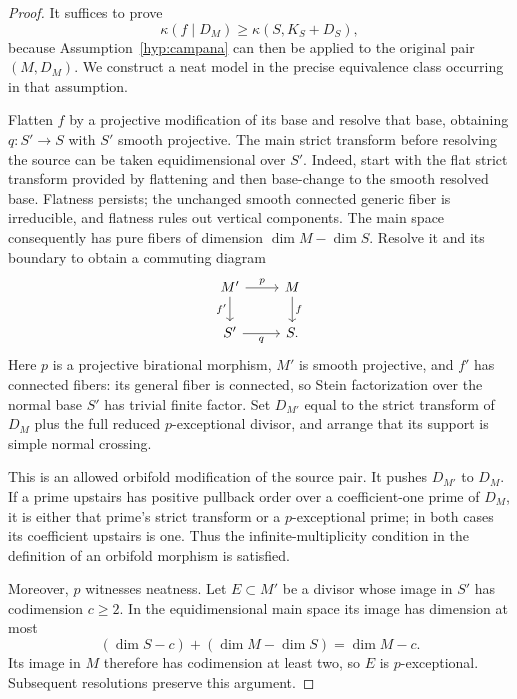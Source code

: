 \begin{proof}
It suffices to prove
\begin{equation}\label{red:invariant-base-bound}
 \kappa(f\mid D_M)\geq\kappa(S,K_S+D_S),
\end{equation}
because Assumption~\ref{hyp:campana} can then be applied to the original
pair \((M,D_M)\). We construct a neat model in the precise equivalence
class occurring in that assumption.

Flatten \(f\) by a projective modification of its base and resolve that
base, obtaining \(q:S'\to S\) with \(S'\) smooth projective. The main
strict transform before resolving the source can be taken
equidimensional over \(S'\). Indeed, start with the flat strict transform
provided by flattening and then base-change to the smooth resolved
base. Flatness persists; the unchanged smooth connected generic fiber
is irreducible, and flatness rules out vertical components. The main
space consequently has pure fibers of dimension \(\dim M-\dim S\).
Resolve it and its boundary to obtain a commuting diagram
\[
\begin{tikzcd}
 M' \arrow[r,"p"] \arrow[d,"f'"'] & M \arrow[d,"f"]\\
 S' \arrow[r,"q"'] & S .
\end{tikzcd}
\]
Here \(p\) is a projective birational morphism, \(M'\) is smooth
projective, and \(f'\) has connected fibers: its general fiber is
connected, so Stein factorization over the normal base \(S'\) has trivial
finite factor. Set \(D_{M'}\) equal to the strict transform of \(D_M\)
plus the full reduced \(p\)-exceptional divisor, and arrange that its
support is simple normal crossing.

This is an allowed orbifold modification of the source pair. It pushes
\(D_{M'}\) to \(D_M\). If a prime upstairs has positive pullback order
over a coefficient-one prime of \(D_M\), it is either that prime's
strict transform or a \(p\)-exceptional prime; in both cases its
coefficient upstairs is one. Thus the infinite-multiplicity condition
in the definition of an orbifold morphism is satisfied.

Moreover, \(p\) witnesses neatness. Let \(E\subset M'\) be a divisor
whose image in \(S'\) has codimension \(c\geq2\). In the equidimensional
main space its image has dimension at most
\[
 (\dim S-c)+(\dim M-\dim S)=\dim M-c.
\]
Its image in \(M\) therefore has codimension at least two, so \(E\) is
\(p\)-exceptional. Subsequent resolutions preserve this argument.


\end{proof}
